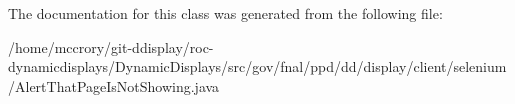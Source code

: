 The documentation for this class was generated from the following file\-:\begin{DoxyCompactItemize}
\item 
/home/mccrory/git-\/ddisplay/roc-\/dynamicdisplays/\-Dynamic\-Displays/src/gov/fnal/ppd/dd/display/client/selenium/Alert\-That\-Page\-Is\-Not\-Showing.\-java\end{DoxyCompactItemize}
